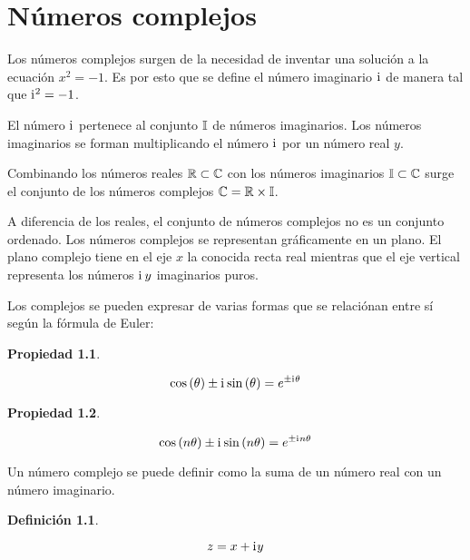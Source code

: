 \documentclass[a5paper,12pt,twoside]{book}
\newtheorem{defn}{{Definición}}[chapter]
\newtheorem{prop}{{Propiedad}}[chapter]
\begin{document}
\chapter{Números complejos}


Los números complejos surgen de la necesidad de inventar una solución a la ecuación $x^2=-1$. Es por esto que se define el número imaginario $\mathrm{i}\mkern1mu$ de manera tal que $\mathrm{i}\mkern1mu^2=-1$.

El número $\mathrm{i}\mkern1mu$ pertenece al conjunto $\mathbb{I}$ de números imaginarios. Los números imaginarios se forman multiplicando el número $\mathrm{i}\mkern1mu$ por un número real $y$.

Combinando los números reales $\mathbb{R} \subset \mathbb{C}$ con los números imaginarios $\mathbb{I} \subset \mathbb{C}$ surge el conjunto de los números complejos $\mathbb{C}=\mathbb{R} \times \mathbb{I}$.

A diferencia de los reales, el conjunto de números complejos no es un conjunto ordenado. Los números complejos se representan gráficamente en un plano. El plano complejo tiene en el eje $x$ la conocida recta real mientras que el eje vertical representa los números $\mathrm{i}\mkern1mu \, y$ imaginarios puros.

Los complejos se pueden expresar de varias formas que se relaciónan entre sí según la fórmula de Euler:

\begin{mdframed}[style=MyFrame1]
    \begin{prop}
        \label{prop:EulerFormula}
    \end{prop}
    \begin{equation*}
        \cos{(\theta)} \pm \mathrm{i}\mkern1mu \sin{(\theta)} = e^{\pm \mathrm{i}\mkern1mu \theta}
    \end{equation*}
\end{mdframed}

\begin{mdframed}[style=MyFrame1]
    \begin{prop}
    \end{prop}
    \begin{equation*}
        \cos{(n \theta)} \pm \mathrm{i}\mkern1mu \sin{(n \theta)} = e^{\pm \mathrm{i}\mkern1mu n \theta}
    \end{equation*}
\end{mdframed}

Un número complejo se puede definir como la suma de un número real con un número imaginario.

\begin{mdframed}[style=MyFrame1]
    \begin{defn}
        \label{defn:BinomialForm}
    \end{defn}
    \begin{equation*}
        z = x + \mathrm{i}\mkern1mu y
    \end{equation*}
\end{mdframed}
\end{document}
